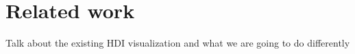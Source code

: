 \section{Related work}
Talk about the existing HDI visualization and what we are going to do differently


